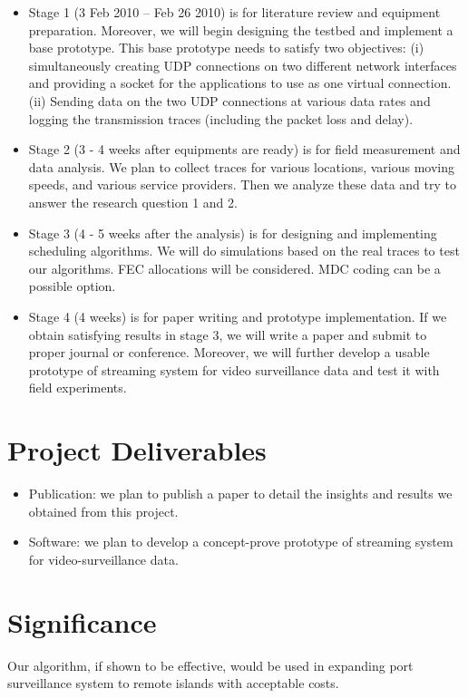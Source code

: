 \documentclass{article}
\begin{document}
    \begin{itemize}
    \item
    Stage 1 (3 Feb 2010 --  Feb 26 2010) is for literature review and equipment preparation.
    Moreover, we will begin designing the testbed and implement a base prototype. This base prototype
    needs to satisfy two objectives: (i) simultaneously creating UDP connections on two different network 
    interfaces and providing a socket for the applications to use as one virtual connection. 
    (ii) Sending data on the two UDP connections at various data rates and logging the transmission traces
    (including the packet loss and delay).

    \item
    Stage 2 (3 - 4 weeks after equipments are ready) is for field measurement and data analysis. 
    We plan to collect traces for various locations, various moving speeds, and various service providers.
    Then we analyze these data and try to answer the research question 1 and 2. 

    \item
    Stage 3 (4 - 5 weeks after the analysis) is for designing and implementing scheduling algorithms.
    We will do simulations based on the real traces to test our algorithms. FEC allocations will be considered.
    MDC coding can be a possible option.

    \item
    Stage 4 (4 weeks) is for paper writing and prototype implementation. If we obtain satisfying results
    in stage 3, we will write a paper and submit to proper journal or conference. Moreover, we will further 
    develop a usable prototype of streaming system for video surveillance data and test it with field experiments.
    \end{itemize}
    
\section{Project Deliverables}
    \begin{itemize}
    \item
    Publication: we plan to publish a paper to detail the insights and results we obtained from this project.
    \item
    Software: we plan to develop a concept-prove prototype of streaming system for video-surveillance data.
    \end{itemize}
\section{Significance}
    Our algorithm, if shown to be effective, would be used in expanding port surveillance system 
    to remote islands with acceptable costs.



\end{document}
